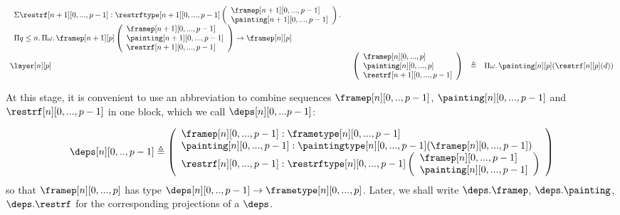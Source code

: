 \documentclass{msc}
\newcommand{\defeq}{\ensuremath{\triangleq}}
\begin{document}
\begin{equation*}
\begin{array}{llcl}
    \begin{array}{l}
      \Sigma \restrf[n+1][0,...,p-1]
      :\restrftype[n+1][0,...,p-1]
      \left(\begin{array}{l}
                \framep[n+1][0,...,p-1]   \\
                \painting[n+1][0,...,p-1] \\
              \end{array}\right)                         .  \\
      \Pi q\leq n.\,\Pi \omega.\,\framep[n+1][p]
      \left(\begin{array}{l}
                \framep[n+1][0,...,p-1]   \\
                \painting[n+1][0,...,p-1] \\
                \restrf[n+1][0,...,p-1]   \\
              \end{array}\right) \rightarrow  \framep[n][p] \\
    \end{array} \\
    \layer[n][p]                  &
    \left(\begin{array}{l}
              \framep[n][0,...,p]     \\
              \painting[n][0,...,p]   \\
              \restrf[n+1][0,...,p-1] \\
            \end{array}\right)    & \defeq &
    \Pi\omega.\,\painting[n][p](\restrf[n][p](d))
  \end{array}
\end{equation*}

At this stage, it is convenient to use an abbreviation to combine sequences $\framep[n][0,..,p-1]$, $\painting[n][0,...,p-1]$ and $\restrf[n][0,...,p-1]$ in one block, which we call $\deps[n][0,...p-1]$:

\begin{align*}
  \deps[n][0,..,p-1] \defeq
  \left(\begin{array}{l}
            \framep[n][0,...,p-1] :\frametype[n][0,...,p-1] \\
            \painting[n][0,...,p-1] :\paintingtype[n][0,...,p-1]
            (\framep[n][0,...,p-1])                         \\
            \restrf[n][0,...,p-1]  :\restrftype[n][0,...,p-1]
            \left(\begin{array}{l}
                \framep[n][0,...,p-1]   \\
                \painting[n][0,...,p-1] \\
              \end{array}\right)                   \\
          \end{array}\right)
\end{align*}
so that $\framep[n][0,...,p]$ has type $\deps[n][0,..,p-1] \rightarrow \frametype[n][0,...,p]$. Later, we shall write $\deps.\framep$, $\deps.\painting$, $\deps.\restrf$ for the corresponding projections of a $\deps$.
\end{document}
